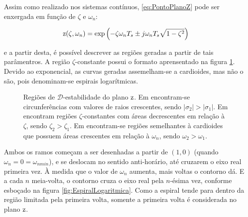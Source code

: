 Assim como realizado nos sistemas contínuos, \eqref{eq:PontoPlanoZ} pode ser enxergada em função de $\zeta$ e $\omega_n$:

\begin{equation}
  \operatorname{\mathrm{z}}(\zeta,\omega_n) = \exp{\left(-\zeta\omega_nT_s \pm j\omega_nT_s\sqrt{1-\zeta^2}\right)}\label{eq:FuncaoPontoZ}
\end{equation}

\noindent e a partir desta, é possível descrever as regiões geradas a partir de tais parâmentros. A região $\zeta$-constante possui o formato aprensentado na figura \ref{subfig:EstabilidadeRelativaZ}. Devido ao exponencial, as curvas geradas assemelham-se a cardioides, mas não o são, pois denominam-se espirais logarítmicas.
\begin{figure}[!ht]
  \centering
  \begin{subfigure}[t]{0.3\columnwidth}
      
      \caption{}
      \label{subfig:EstabilidadeRelativaZ}
  \end{subfigure}
  \begin{subfigure}[t]{0.3\columnwidth}
      
      \caption{}
      \label{subfig:TaxaDeAmortecimentoZ}
  \end{subfigure}
  \begin{subfigure}[t]{0.3\columnwidth}
    
    \caption{}
    \label{subfig:OscilacaoNaoAmortecidaZ}
  \end{subfigure}
  \caption{Regiões de $\mathscr{D}$-estabilidade do plano $\operatorname{\mathrm{z}}$. Em  encontram-se circunferências com valores de raios crescentes, sendo $|\sigma_2| > |\sigma_1|$. Em  encontram regiões $\zeta$-constantes com áreas decrescentes em relação à $\zeta$, sendo $\zeta_2 > \zeta_1$. Em  encontram-se regiões semelhantes à cardioides que possuem áreas crescentes em relação à $\omega_n$, sendo $\omega_2 > \omega_1$.}
  \label{fig:RegioesPlanoZ}
\end{figure}

Ambos os ramos começam a ser desenhadas a partir de $(1,0)$ (quando $\omega_n = 0 = \omega_{nmin}$), e se deslocam no sentido anti-horário, até cruzarem o eixo real primeira vez. À medida que o valor de $\omega_n$ aumenta, mais voltas o contorno dá. E a cada $n$ meia-volta, o contorno cruza o eixo real pela $n$-ésima vez, conforme esboçado na figura \ref{fig:EspiralLogaritmica}. Como a espiral tende para dentro da região limitada pela primeira volta, somente a primeira volta é considerada no plano $\operatorname{\mathrm{z}}$.

